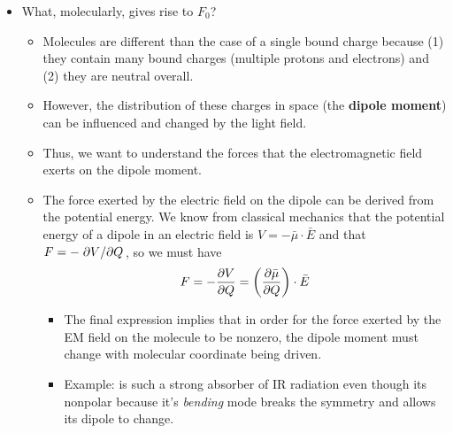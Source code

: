 \documentclass[../notes.tex]{subfiles}
\begin{document}
\begin{itemize}
\begin{itemize}
        \begin{equation*}
            \omega_0 = \sqrt{\frac{k}{m_R}}
        \end{equation*}
        \item Example (comparing two molecules): If we know one molecule's resonance frequency, we can predict another via
        \begin{equation*}
            \frac{\bar{\nu}_1}{\bar{\nu}_2} = \sqrt{\frac{m_{R,2}}{m_{R,1}}}
        \end{equation*}
        \item Example: $m_R(\ce{H{}^35Cl})=0.97$ and $m_R=(\ce{D{}^35Cl})=1.89$, so if $\bar{\nu}$ for  is \SI{2890}{\per\centi\meter}, we predict that $\bar{\nu}$ for  is \SI{2070}{\per\centi\meter}, and indeed that is very close to the measured value.
    \end{itemize}
    \item What, molecularly, gives rise to $F_0$?
    \begin{itemize}
        \item Molecules are different than the case of a single bound charge because (1) they contain many bound charges (multiple protons and electrons) and (2) they are neutral overall.
        \item However, the distribution of these charges in space (the \textbf{dipole moment}) can be influenced and changed by the light field.
        \item Thus, we want to understand the forces that the electromagnetic field exerts on the dipole moment.
        \item The force exerted by the electric field on the dipole can be derived from the potential energy. We know from classical mechanics that the potential energy of a dipole in an electric field is $V=-\bar{\mu}\cdot\bar{E}$ and that $F=-\pdv*{V}{Q}$, so we must have
        \begin{equation*}
            F = -\pdv{V}{Q} = \left( \pdv{\bar{\mu}}{Q} \right)\cdot\bar{E}
        \end{equation*}
        \begin{itemize}
            \item The final expression implies that in order for the force exerted by the EM field on the molecule to be nonzero, the dipole moment must change with molecular coordinate being driven.
            \item Example:  is such a strong absorber of IR radiation even though its nonpolar because it's \emph{bending} mode breaks the symmetry and allows its dipole to change.

\end{itemize}
\end{itemize}
\end{itemize}
\end{document}
